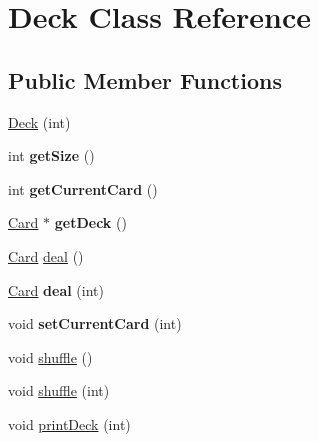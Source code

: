 \hypertarget{class_deck}{\section{Deck Class Reference}
\label{class_deck}
}
\subsection*{Public Member Functions}
\begin{DoxyCompactItemize}
\item 
\hyperlink{class_deck_a5487610d44f13d27ef54c930e2bdadf9}{Deck} (int)
\item 
\hypertarget{class_deck_a6e84b60abbfc3ef41ff8224e3ead95b0}{int {\bfseries get\+Size} ()}\label{class_deck_a6e84b60abbfc3ef41ff8224e3ead95b0}

\item 
\hypertarget{class_deck_a15f1bacae09dff1f77d9c76c27b28555}{int {\bfseries get\+Current\+Card} ()}\label{class_deck_a15f1bacae09dff1f77d9c76c27b28555}

\item 
\hypertarget{class_deck_a37eb23228a26842be5d772ea544fcd8d}{\hyperlink{class_card}{Card} $\ast$ {\bfseries get\+Deck} ()}\label{class_deck_a37eb23228a26842be5d772ea544fcd8d}

\item 
\hyperlink{class_card}{Card} \hyperlink{class_deck_a16604aabf7fc56dd44a72c4e862758cf}{deal} ()
\item 
\hypertarget{class_deck_aa44bf5c7e46793f4743b9b47e9a13a14}{\hyperlink{class_card}{Card} {\bfseries deal} (int)}\label{class_deck_aa44bf5c7e46793f4743b9b47e9a13a14}

\item 
\hypertarget{class_deck_a8a27a8d5e66ab11340ce996445a54ec6}{void {\bfseries set\+Current\+Card} (int)}\label{class_deck_a8a27a8d5e66ab11340ce996445a54ec6}

\item 
void \hyperlink{class_deck_ae5a1e52ab00ae5924f2bc6b730dba3eb}{shuffle} ()
\item 
void \hyperlink{class_deck_a257dea63965473552803e20b222c0490}{shuffle} (int)
\item 
void \hyperlink{class_deck_a76b0a852aab3fb674a8f25f01bcae876}{print\+Deck} (int)
\end{DoxyCompactItemize}


